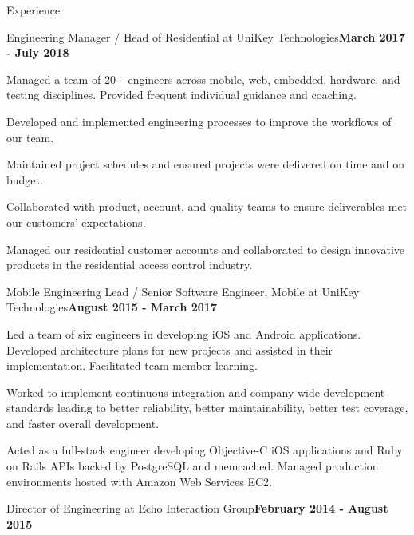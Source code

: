 \documentclass{resume} %
\begin{document}
\begin{rSection}{Experience}


\begin{rSubsection}{Engineering Manager / Head of Residential at UniKey Technologies}{\bf March 2017 - July 2018}{}{}

\item Managed a team of 20+ engineers across mobile, web, embedded, hardware, and testing disciplines.  Provided frequent individual guidance and coaching.
\item Developed and implemented engineering processes to improve the workflows of our team.
\item Maintained project schedules and ensured projects were delivered on time and on budget.
\item Collaborated with product, account, and quality teams to ensure deliverables met our customers' expectations.
\item Managed our residential customer accounts and collaborated to design innovative products in the residential access control industry.

\end{rSubsection}


\begin{rSubsection}{Mobile Engineering Lead / Senior Software Engineer, Mobile at UniKey Technologies}{\bf August 2015 - March 2017}{}{}

\item Led a team of six engineers in developing iOS and Android applications.  Developed architecture plans for new projects and assisted in their implementation. Facilitated team member learning.
\item Worked to implement continuous integration and company-wide development standards leading to better reliability, better maintainability, better test coverage, and faster overall development.
\item Acted as a full-stack engineer developing Objective-C iOS applications and Ruby on Rails APIs backed by PostgreSQL and memcached. Managed production environments hosted with Amazon Web Services EC2.

\end{rSubsection}


\begin{rSubsection}{Director of Engineering at Echo Interaction Group}{\bf February 2014 - August 2015}{}{}


\end{rSubsection}
\end{rSection}
\end{document}
